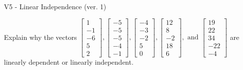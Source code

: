 \begin{exercise}
  \begin{exerciseTitle}V5 - Linear Independence (ver. 1)\end{exerciseTitle}
  \begin{exerciseStatement}
    Explain why the vectors \(\left[\begin{array}{r}
1 \\
-1 \\
-6 \\
5 \\
2
\end{array}\right] , \left[\begin{array}{r}
-5 \\
-5 \\
-5 \\
-4 \\
-1
\end{array}\right] , \left[\begin{array}{r}
-4 \\
-3 \\
-2 \\
5 \\
0
\end{array}\right] , \left[\begin{array}{r}
12 \\
8 \\
-2 \\
18 \\
6
\end{array}\right] , \text{ and } \left[\begin{array}{r}
19 \\
22 \\
34 \\
-22 \\
-4
\end{array}\right]\) are linearly dependent or linearly independent.	



\end{exerciseStatement}
\end{exercise}
